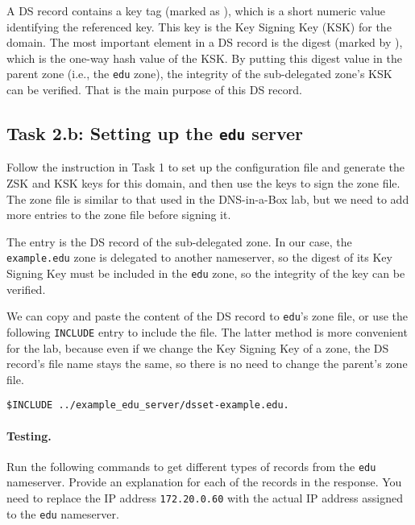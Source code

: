 A DS record contains a key tag (marked as ), which is a 
short numeric value identifying the referenced key. This key
is the Key Signing Key (KSK) for the domain.
The most important element in a DS record is the digest (marked by ),
which is the one-way hash value of the KSK. By putting this digest
value in the parent zone (i.e., the \texttt{edu} zone), 
the integrity of the sub-delegated zone's
KSK can be verified. That is the main purpose of this DS record. 



\subsection{Task 2.b: Setting up the \texttt{edu} server} 

Follow the instruction in Task 1 to set up the configuration 
file and generate the ZSK and KSK keys 
for this domain, and then use the keys to sign
the zone file. The zone file is similar to that used 
in the DNS-in-a-Box lab, but we need to add more 
entries to the zone file before signing it. 


The entry is the DS record of the sub-delegated zone. 
In our case, the \texttt{example.edu} zone is delegated to 
another nameserver, so the digest of its Key Signing Key must 
be included in the \texttt{edu} zone, so the 
integrity of the key can be verified. 


We can copy and paste the content of the DS record to 
\texttt{edu}'s zone file, or use the following
\texttt{INCLUDE} entry to include the file. The latter 
method is more convenient for the lab, because even if we 
change the Key Signing Key of a zone, the DS record's file name stays the same,
so there is no need to change the parent's zone file.

\begin{lstlisting}
$INCLUDE ../example_edu_server/dsset-example.edu.
\end{lstlisting}
 

\paragraph{Testing.} 
Run the following commands to get different types of records
from the \texttt{edu} nameserver. Provide an explanation
for each of the records in the response. You need to
replace the IP address \texttt{172.20.0.60} with the actual
IP address assigned to the \texttt{edu} nameserver.


